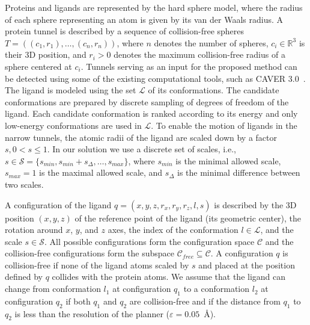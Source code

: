 \documentclass[usletter, 10pt, conference]{ieeeconf} %
\def\C{\mathcal{C}}
\def\CF{\mathcal{C}_{free}}
\def\R{\mathbb{R}}
\def\smin{s_{min}}
\def\smax{s_{max}}
\def\sdelta{s_{\Delta}}
\def\L{\mathcal{L}}
\def\S{\mathcal{S}}
\begin{document}
Proteins and ligands are represented by the hard sphere model, where the radius of each sphere representing an atom is given by its van der Waals radius.
A protein tunnel is described by a sequence of collision-free spheres 
$T=( (c_1, r_1),\ldots,(c_n,r_n) )$, where $n$ denotes the number of spheres,
$c_i \in \R^3$ is their 3D position, and $r_i > 0$ denotes the maximum collision-free radius of a sphere centered at $c_i$. 
Tunnels serving as an input for the proposed method can be detected using some of the existing computational tools, such as CAVER 3.0~\cite{caver3}.
The ligand is modeled using the set $\L$ of its conformations.
The candidate conformations are prepared by discrete sampling of degrees of freedom of the ligand.
Each candidate conformation is ranked according to its energy and only low-energy conformations are used in $\L$.
To enable the motion of ligands in the narrow tunnels, the atomic radii of the ligand are scaled down by a factor $s, 0 < s \le 1$.
In our solution we use a discrete set of scales, i.e., $s \in \S=\{\smin, \smin+\sdelta, \ldots, \smax\}$, where 
$\smin$ is the minimal allowed scale, $\smax=1$ is the maximal allowed scale, and $\sdelta$ is the minimal difference between two scales.

A configuration of the ligand $q=(x,y,z,r_x,r_y,r_z,l,s)$ is described
by the 3D position $(x,y,z)$ of the reference point of the ligand (its geometric center), the rotation around $x$, $y$, and $z$ axes,
the index of the conformation $l\in \L$, and the scale $s \in \S$.
All possible configurations form the configuration space $\C$ and the collision-free configurations
form the subspace $\CF \subseteq \C$.
A configuration $q$ is collision-free if none of the ligand atoms scaled by $s$ and placed at the
position defined by $q$ collides with the protein atoms.
We assume that the ligand can change from conformation $l_1$ at configuration $q_1$ to a conformation $l_2$ at configuration $q_2$
if both $q_1$ and $q_2$ are collision-free and if the distance from $q_1$ to $q_2$ is less than the resolution of the planner ($\varepsilon=0.05$~\AA).
\end{document}
